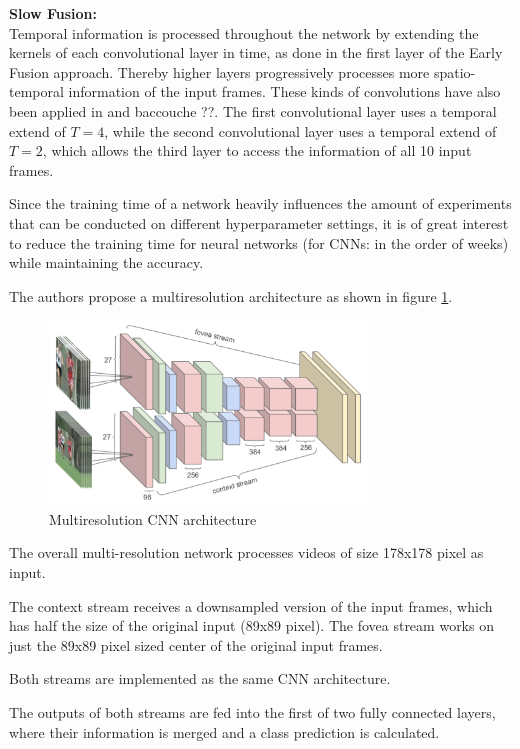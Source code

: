 \textbf{Slow Fusion:} \\
Temporal information is processed throughout the network by extending the kernels of each convolutional layer in time, as done in the first layer of the Early Fusion approach.
Thereby higher layers progressively processes more spatio-temporal information of the input frames.
These kinds of convolutions have also been applied in \cite{ji_3d_2013} and baccouche ??.
The first convolutional layer uses a temporal extend of $T = 4$, while the second convolutional layer uses a temporal extend of $T = 2$, which allows the third layer to access the information of all 10 input frames.

Since the training time of a network heavily influences the amount of experiments that can be conducted on different hyperparameter settings, it is of great interest to reduce the training time for neural networks (for CNNs: in the order of weeks) while maintaining the accuracy.

The authors propose a multiresolution architecture as shown in figure \ref{fig:largescale_multiresolution}.

\begin{figure}[H]
    \centering
    \includegraphics[width=0.75\textwidth]{img_deep/largescale_multiresolution.png}
    \caption{Multiresolution CNN architecture \cite{karpathy_large-scale_2014}}
    \label{fig:largescale_multiresolution}
\end{figure}

The overall multi-resolution network processes videos of size 178x178 pixel as input.

The context stream receives a downsampled version of the input frames, which has half the size of the original input (89x89 pixel).
The fovea stream works on just the 89x89 pixel sized center of the original input frames.

Both streams are implemented as the same CNN architecture.

The outputs of both streams are fed into the first of two fully connected layers, where their information is merged and a class prediction is calculated.

